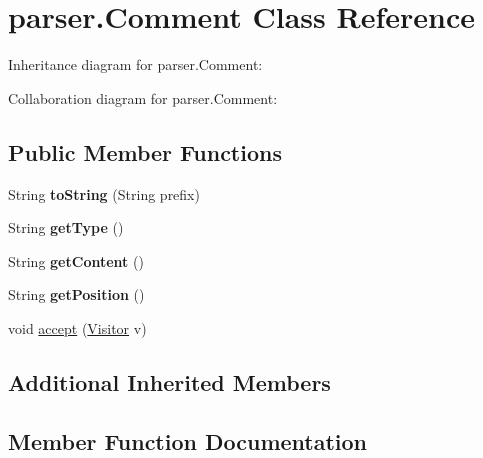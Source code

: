 \hypertarget{classparser_1_1_comment}{}\section{parser.\+Comment Class Reference}
\label{classparser_1_1_comment}


Inheritance diagram for parser.\+Comment\+:


Collaboration diagram for parser.\+Comment\+:
\subsection*{Public Member Functions}
\begin{DoxyCompactItemize}
\item 
String {\bfseries to\+String} (String prefix)\hypertarget{classparser_1_1_comment_a27b96d1a4e24ae26fbe8e2d45b1f7a20}{}\label{classparser_1_1_comment_a27b96d1a4e24ae26fbe8e2d45b1f7a20}

\item 
String {\bfseries get\+Type} ()\hypertarget{classparser_1_1_comment_aa14b26cd737220c285c57ca26d80d77f}{}\label{classparser_1_1_comment_aa14b26cd737220c285c57ca26d80d77f}

\item 
String {\bfseries get\+Content} ()\hypertarget{classparser_1_1_comment_a1733342085445cf01c065cf0cb816205}{}\label{classparser_1_1_comment_a1733342085445cf01c065cf0cb816205}

\item 
String {\bfseries get\+Position} ()\hypertarget{classparser_1_1_comment_ae00edc0ab43cd7070a60535812f3914c}{}\label{classparser_1_1_comment_ae00edc0ab43cd7070a60535812f3914c}

\item 
void \hyperlink{classparser_1_1_comment_a6b79b228aa074b14b9d477b390d58eb9}{accept} (\hyperlink{interfacemain_1_1_visitor}{Visitor} v)
\end{DoxyCompactItemize}
\subsection*{Additional Inherited Members}


\subsection{Member Function Documentation}
